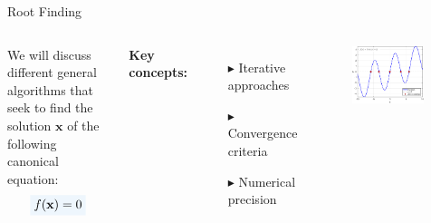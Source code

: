 \documentclass[aspectratio=169]{beamer}
\newcommand{\highlight}[2]{\colorbox{#1!9}{$#2$}}
\begin{document}
\begin{frame}{Root Finding}
    \begin{columns}
            We will discuss different general algorithms that seek to find the solution $\mathbf{x}$ of the following canonical equation:
            \begin{equation*}
                \highlight{accentcolor}{f(\mathbf{x}) = 0}
            \end{equation*}
            
            \vspace{1em}
            \small
            \textcolor{accentcolor}{\textbf{Key concepts:}}
            \begin{itemize}
                \item[$\blacktriangleright$] Iterative approaches
                \item[$\blacktriangleright$] Convergence criteria
                \item[$\blacktriangleright$] Numerical precision
            \end{itemize}
            
            \begin{figure}
            \centering
                \includegraphics[width=0.95\textwidth]{figures/roots.pdf}
            \end{figure}
    \end{columns}
\end{frame}
\end{document}
